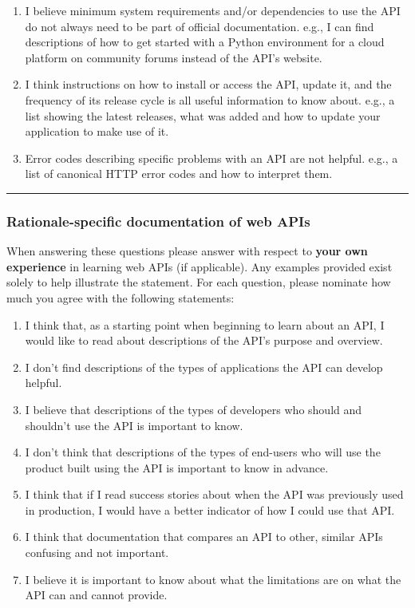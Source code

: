 \begin{enumerate}[label=Q3\alph*.,leftmargin=2\parindent]
\item  I believe minimum system requirements and/or dependencies to use the API do not always need to be part of official documentation. 
   e.g., I can find descriptions of how to get started with a Python environment for a cloud platform on community forums instead of the API's website.   
\item  I think instructions on how to install or access the API, update it, and the frequency of its release cycle is all useful information to know about. 
   e.g., a list showing the latest releases, what was added and how to update your application to make use of it.   
\item  Error codes describing specific problems with an API are not helpful. 
   e.g., a list of canonical HTTP error codes and how to interpret them.   
\end{enumerate}

\bigskip\hrule
\subsubsection*{Rationale-specific documentation of web APIs}\noindent
When answering these questions please answer with respect to \textbf{your own experience} in learning web APIs (if applicable). Any examples provided exist solely to help illustrate the statement. For each question, please nominate how much you agree with the following statements: \AgreementScale

\begin{enumerate}[label=Q4\alph*.,leftmargin=2\parindent]
\item I think that, as a starting point when beginning to learn about an API, I would like to read about descriptions of the API's purpose and overview. 
\item I don't find descriptions of the types of applications the API can develop helpful. 
\item I believe that descriptions of the types of developers who should and shouldn't use the API is important to know. 
\item I don't think that descriptions of the types of end-users who will use the product built using the API is important to know in advance. 
\item I think that if I read success stories about when the API was previously used in production, I would have a better indicator of how I could use that API. 
\item I think that documentation that compares an API to other, similar APIs confusing and not important. 
\item I believe it is important to know about what the limitations are on what the API can and cannot provide. 
\end{enumerate}


